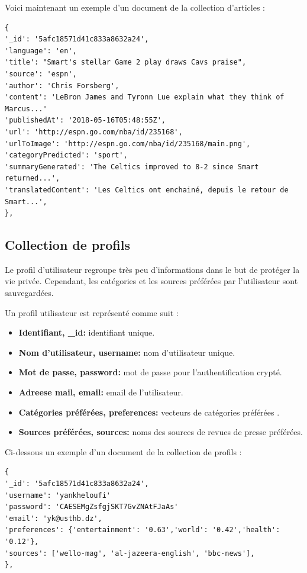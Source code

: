 Voici maintenant un exemple d'un document de la collection d'articles :
\begin{lstlisting}[style=code]
{
'_id': '5afc18571d41c833a8632a24', 
'language': 'en',
'title': "Smart's stellar Game 2 play draws Cavs praise", 
'source': 'espn', 
'author': 'Chris Forsberg', 
'content': 'LeBron James and Tyronn Lue explain what they think of Marcus...'
'publishedAt': '2018-05-16T05:48:55Z', 
'url': 'http://espn.go.com/nba/id/235168',
'urlToImage': 'http://espn.go.com/nba/id/235168/main.png',  
'categoryPredicted': 'sport', 
'summaryGenerated': 'The Celtics improved to 8-2 since Smart returned...', 
'translatedContent': 'Les Celtics ont enchainé, depuis le retour de Smart...', 
},
\end{lstlisting}

\subsection{Collection de profils}
Le profil d'utilisateur regroupe très peu d'informations dans le but de protéger la vie privée. Cependant, les catégories et les sources préférées par l'utilisateur sont sauvegardées. 

Un profil utilisateur est représenté comme suit :
\begin{itemize}
    \item \textbf{Identifiant, \textquotedbl  \_id\textquotedbl : } identifiant unique.
    \item \textbf{Nom d'utilisateur, \textquotedbl  username\textquotedbl : } nom d'utilisateur unique.
    \item \textbf{Mot de passe, \textquotedbl  password\textquotedbl : } mot de passe pour l'authentification crypté.
    \item \textbf{Adreese mail, \textquotedbl  email\textquotedbl : } email de l'utilisateur.
    \item \textbf{Catégories préférées, \textquotedbl  preferences\textquotedbl : } vecteurs de catégories préférées .
    \item \textbf{Sources préférées, \textquotedbl  sources\textquotedbl : } noms des sources de revues de presse préférées. 
\end{itemize}

Ci-dessous un exemple d'un document de la collection de profils :
\begin{lstlisting}[style=code]
{
'_id': '5afc18571d41c833a8632a24', 
'username': 'yankheloufi'
'password': 'CAESEMgZsfgjSKT7GvZNAtFJaAs'
'email': 'yk@usthb.dz',
'preferences': {'entertainment': '0.63','world': '0.42','health': '0.12'},
'sources': ['wello-mag', 'al-jazeera-english', 'bbc-news'],
},
\end{lstlisting}


